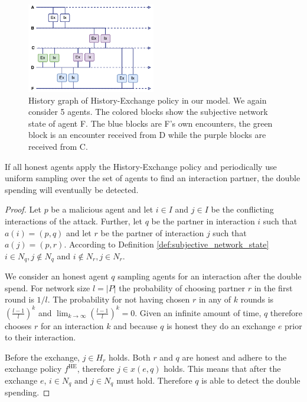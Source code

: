 \begin{figure}
    \centering
    \includegraphics[width=0.5\textwidth]{images/chain_exchange.pdf}
    \caption{History graph of History-Exchange policy in our model. We again consider 5 agents. The 
    colored blocks show the subjective network state of agent F. The blue blocks are F's own encounters,
    the green block is an encounter received from D while the purple blocks are received from C.}
    \label{fig:chain_exchange}
\end{figure}

\begin{thm}
    \label{thm:fork_gossiping}
    If all honest agents apply the History-Exchange policy and periodically use uniform sampling over
    the set of agents to find an interaction partner, the double spending will eventually be detected.
\end{thm}
\begin{proof}
    Let $p$ be a malicious agent and let $i \in I$ and $j \in I$ be the conflicting 
    interactions of the attack. 
    Further, let $q$ be the partner in interaction $i$ such that 
    $a(i) = (p, q)$ and let $r$ be the partner of interaction $j$ such that $a(j) = (p, r)$. 
    According to Definition \ref{def:subjective_network_state} $i \in N_{q}, j \notin N_{q}$ and 
    $i \notin N_{r}, j \in N_{r}$.

    We consider an honest agent $q$ sampling agents for an interaction after the double spend. 
    For network size $l = |P|$ the 
    probability of choosing partner $r$ in the first round is $1/l$. The probability for not having
    chosen $r$ in any of $k$ rounds is $(\frac{l-1}{l})^k$ and $\lim_{k\to\infty}(\frac{l-1}{l})^k = 0$.
    Given an infinite amount of time, $q$ therefore chooses $r$ for an interaction $k$ and because $q$ is 
    honest they do an exchange $e$ prior to their interaction. 
    
    Before the exchange, $j \in H_r$ holds. Both $r$ and $q$ are honest and adhere to the exchange 
    policy $f^{\text{HE}}$, therefore $j \in x(e, q)$ holds. This means that after the exchange $e$, 
    $i \in N_q \text{ and } j \in N_q$ must hold. Therefore $q$ is able to detect the double spending.
\end{proof}

